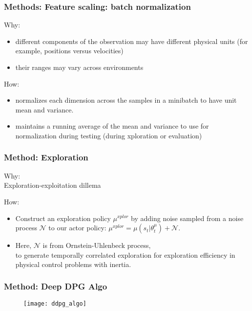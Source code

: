 \begin{frame}
\frametitle{Methods: Feature scaling: batch normalization}
Why:
\begin{itemize}
\item different components of the observation may have different physical units (for example, positions versus velocities)
\item their ranges may vary across environments
\end{itemize}
\vspace{5mm}

How:
\begin{itemize}
\item normalizes each dimension across the samples in a minibatch to have unit mean and variance.
\item maintains a running average of the mean and variance to use for normalization during testing
(during xploration or evaluation)
\end{itemize}

\end{frame}

\begin{frame}
\frametitle{Method: Exploration}
Why:\\
Exploration-exploitation dillema
\vspace{5mm}

How:\\
\begin{itemize}
\item Construct an exploration policy $\mu^{xplor}$ by adding noise sampled from
a noise process $\mathcal{N}$ to our actor policy:
$\mu^{xplor} = \mu(s_t | \theta^{\mu}_t) + \mathcal{N}$.\\
\item Here, $\mathcal{N}$ is from Ornstein-Uhlenbeck process,\\
to generate temporally correlated exploration for exploration efficiency in physical control problems with inertia.
\end{itemize}
\end{frame}

\begin{frame}
\frametitle{Method: Deep DPG Algo}
\begin{figure}
    \centering
    \texttt{[image: ddpg\_algo]}
\end{figure}
\end{frame}

